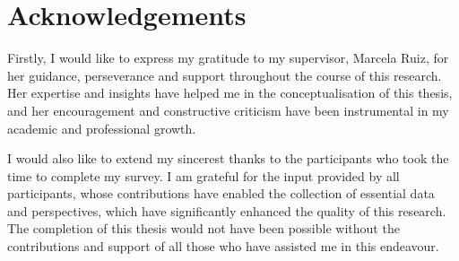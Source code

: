 

\chapter*{Acknowledgements} %

Firstly, I would like to express my gratitude to my supervisor, Marcela Ruiz, for her guidance, perseverance and support throughout the course of this research. Her expertise and insights have helped me in the conceptualisation of this thesis, and her encouragement and constructive criticism have been instrumental in my academic and professional growth.

I would also like to extend my sincerest thanks to the participants who took the time to complete my survey. I am grateful for the input provided by all participants, whose contributions have enabled the collection of essential data and perspectives, which have significantly enhanced the quality of this research.
The completion of this thesis would not have been possible without the contributions and support of all those who have assisted me in this endeavour.
